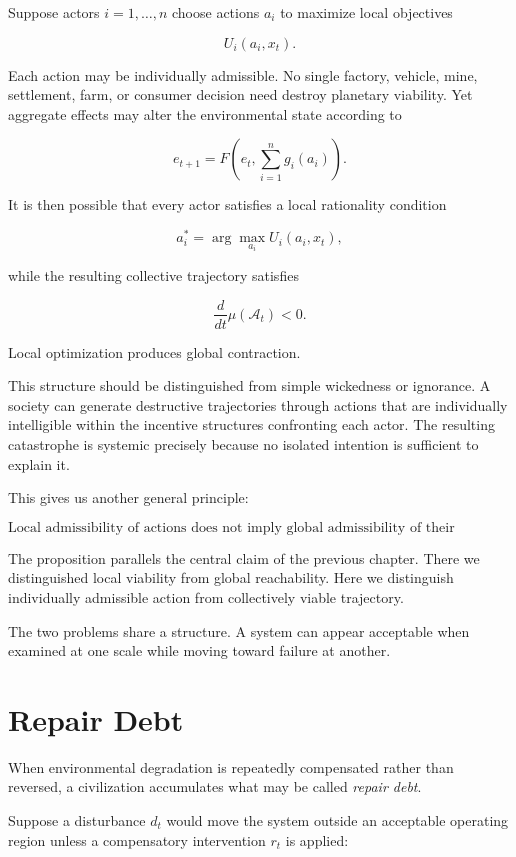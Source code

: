 \documentclass[11pt,oneside]{book}
\theoremstyle{definition}
\theoremstyle{remark}
\newcommand{\A}{\mathcal{A}}
\begin{document}
Suppose actors \(i=1,\ldots,n\) choose actions \(a_i\) to maximize local objectives

\[
U_i(a_i,x_t).
\]

Each action may be individually admissible. No single factory, vehicle, mine, settlement, farm, or consumer decision need destroy planetary viability. Yet aggregate effects may alter the environmental state according to

\[
e_{t+1}
=
F\!\left(
e_t,
\sum_{i=1}^{n}g_i(a_i)
\right).
\]

It is then possible that every actor satisfies a local rationality condition

\[
a_i^\ast
=
\arg\max_{a_i} U_i(a_i,x_t),
\]

while the resulting collective trajectory satisfies

\[
\frac{d}{dt}\mu(\A_t)<0.
\]

Local optimization produces global contraction.

This structure should be distinguished from simple wickedness or ignorance. A society can generate destructive trajectories through actions that are individually intelligible within the incentive structures confronting each actor. The resulting catastrophe is systemic precisely because no isolated intention is sufficient to explain it.

This gives us another general principle:

\[
\boxed{
\text{Local admissibility of actions does not imply global admissibility of their composition.}
}
\]

The proposition parallels the central claim of the previous chapter. There we distinguished local viability from global reachability. Here we distinguish individually admissible action from collectively viable trajectory.

The two problems share a structure. A system can appear acceptable when examined at one scale while moving toward failure at another.

\section{Repair Debt}

When environmental degradation is repeatedly compensated rather than reversed, a civilization accumulates what may be called \emph{repair debt}.

Suppose a disturbance \(d_t\) would move the system outside an acceptable operating region unless a compensatory intervention \(r_t\) is applied:
\end{document}
